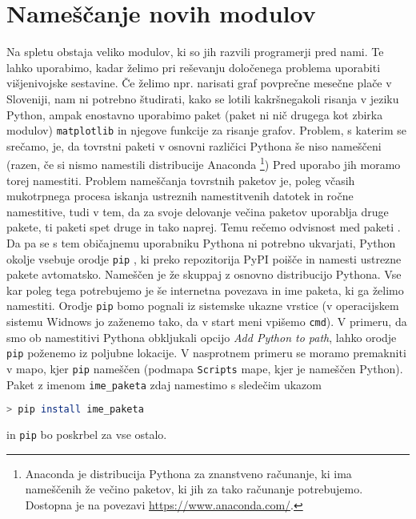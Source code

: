 \section{Nameščanje novih modulov}
Na spletu obstaja veliko modulov, ki so jih razvili programerji pred nami. Te lahko uporabimo, kadar želimo pri reševanju določenega problema uporabiti višjenivojske sestavine. Če želimo npr. narisati graf povprečne mesečne plače v Sloveniji, nam ni potrebno študirati, kako se lotili kakršnegakoli risanja v jeziku Python, ampak enostavno uporabimo paket (paket ni nič drugega kot zbirka modulov) \texttt{matplotlib} in njegove funkcije za risanje grafov. Problem, s katerim se srečamo, je, da tovrstni paketi v osnovni različici Pythona še niso nameščeni (razen, če si nismo namestili distribucije Anaconda \footnote{Anaconda je distribucija Pythona za znanstveno računanje, ki ima nameščenih že večino paketov, ki jih za tako računanje potrebujemo. Dostopna je na povezavi \url{https://www.anaconda.com/}.}) Pred uporabo jih moramo torej namestiti. Problem nameščanja tovrstnih paketov je, poleg včasih mukotrpnega procesa iskanja ustreznih namestitvenih datotek in ročne namestitive, tudi v tem, da za svoje delovanje večina paketov uporablja druge pakete, ti paketi spet druge in tako naprej. Temu rečemo odvisnost med paketi . Da pa se s tem običajnemu uporabniku Pythona ni potrebno ukvarjati, Python okolje vsebuje orodje \texttt{pip} , ki preko repozitorija PyPI  poišče in namesti ustrezne pakete avtomatsko. Nameščen je že skuppaj z osnovno distribucijo Pythona. Vse kar poleg tega potrebujemo je še internetna povezava in ime paketa, ki ga želimo namestiti. Orodje \texttt{pip} bomo pognali iz sistemske ukazne vrstice (v operacijskem sistemu Widnows jo zaženemo tako, da v start meni vpišemo \texttt{cmd}). V primeru, da smo ob namestitivi Pythona obkljukali opcijo \emph{Add Python to path}, lahko orodje \texttt{pip} poženemo iz poljubne lokacije. V nasprotnem primeru se moramo premakniti v mapo, kjer \texttt{pip} nameščen (podmapa \texttt{Scripts} mape, kjer je nameščen Python). Paket z imenom \texttt{ime\_paketa}  zdaj namestimo s sledečim ukazom
\begin{lstlisting}[language=bash]
> pip install ime_paketa
\end{lstlisting}
in \texttt{pip} bo poskrbel za vse ostalo.






